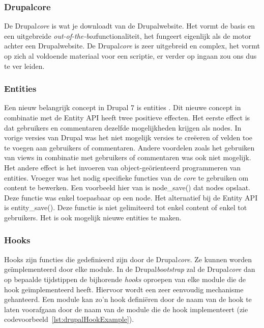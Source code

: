 \subsubsection{Drupalcore}
De Drupal\textit{core} is wat je downloadt van de Drupalwebsite. Het vormt de basis en een uitgebreide \textit{out-of-the-box}functionaliteit, het fungeert eigenlijk als de motor achter een Drupalwebsite. De Drupal\textit{core} is zeer uitgebreid en complex, het vormt op zich al voldoende materiaal voor een scriptie, er verder op ingaan zou ons dus te ver leiden.

\subsubsection{Entities}
Een nieuw belangrijk concept in Drupal 7 is entities \cite{entities}. Dit nieuwe concept in combinatie met de Entity API heeft twee positieve effecten. Het eerste effect is dat gebruikers en commentaren dezelfde mogelijkheden krijgen als nodes. In vorige versies van Drupal was het niet mogelijk versies te cre\"{e}eren of velden toe te voegen aan gebruikers of commentaren. Andere voordelen zoals het gebruiken van views in combinatie met gebruikers of commentaren was ook niet mogelijk. Het andere effect is het invoeren van object-ge\"{o}rienteerd programmeren van entities. Vroeger was het nodig specifieke functies van de \textit{core} te gebruiken om content te bewerken. Een voorbeeld hier van is node\_save() dat nodes opslaat. Deze functie was enkel toepasbaar op een node. Het alternatief bij de Entity API is entity\_save(). Deze functie is niet gelimiteerd tot enkel content of enkel tot gebruikers.
Het is ook mogelijk nieuwe entities te maken. %

\subsubsection{Hooks}
Hooks zijn functies die gedefinieerd zijn door de Drupal\textit{core}. Ze kunnen worden ge\"{i}mplementeerd door elke module. In de Drupal\textit{bootstrap} zal de Drupal\textit{core} dan op bepaalde tijdstippen de bijhorende \textit{hooks} oproepen van elke module die de hook ge\"{i}mplementeerd heeft. Hiervoor wordt een zeer eenvoudig mechanisme gehanteerd. Een module kan zo'n hook defini\"{e}ren door de naam van de hook te laten voorafgaan door de naam van de module die de hook implementeert (zie codevoorbeeld~\ref{lst:drupalHookExample}).

